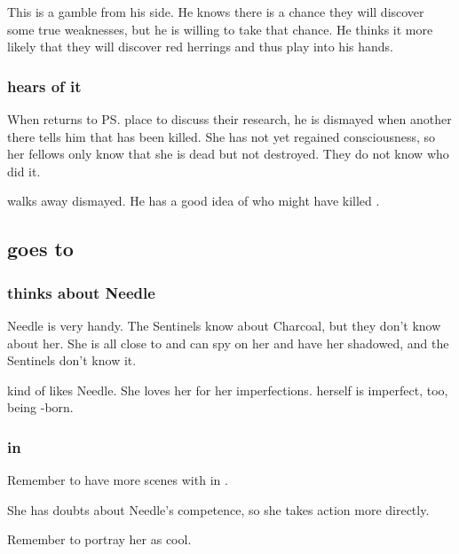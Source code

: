 This is a gamble from his side. 
He knows there is a chance they will discover some true weaknesses, but he is willing to take that chance. 
He thinks it more likely that they will discover red herrings and thus play into his hands. 





\subsubsection{\Teshrial{} hears of it}
When \Teshrial{} returns to \ps{\Urizeth} place to discuss their research, he is dismayed when another \resphan{} there tells him that \Urizeth{} has been killed. 
She has not yet regained consciousness, so her fellows only know that she is dead but not destroyed. 
They do not know who did it. 

\Teshrial{} walks away dismayed. 
He has a good idea of who might have killed \Urizeth{}. 









\subsection{\Achsah goes to \Forclin}





\subsubsection{\Achsah{} thinks about Needle}
Needle is very handy. 
The Sentinels know about Charcoal, but they don't know about her. 
She is all close to \Tiroco{} and can spy on her and have her shadowed, and the Sentinels don't know it. 

\Achsah{} kind of likes Needle. 
She loves her for her imperfections. 
\Achsah{} herself is imperfect, too, being \bezed-born. 




\subsubsection{\Achsah{} in \Malcur}
Remember to have more scenes with \Achsah{} in \Malcur. 

She has doubts about Needle's competence, so she takes action more directly. 

Remember to portray her as cool. 





